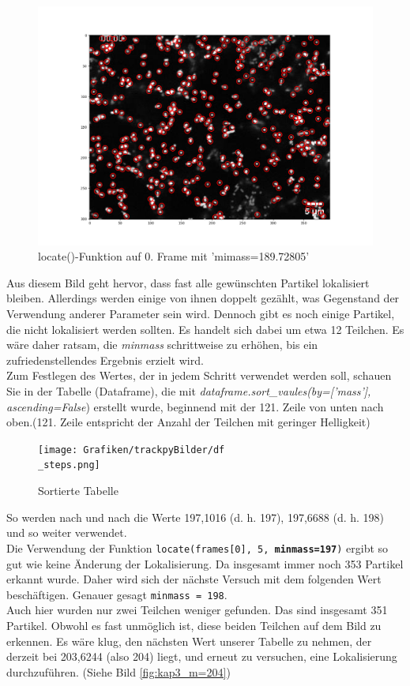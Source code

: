 \begin{enumerate}
\begin{figure}[H]
    \centering
    \includegraphics[scale=0.35]{Grafiken/trackpyBilder/locate_with_minmass_01.png}
    \caption{locate()-Funktion auf 0. Frame mit 'mimass=189.72805'}
    \label{fig:kap3_m=189}
\end{figure}

Aus diesem Bild geht hervor, dass fast alle gewünschten Partikel lokalisiert bleiben. Allerdings werden einige von ihnen doppelt gezählt, was Gegenstand der Verwendung anderer Parameter sein wird. Dennoch gibt es noch einige Partikel, die nicht lokalisiert werden sollten. Es handelt sich dabei um etwa 12 Teilchen. Es wäre daher ratsam, die \textit{minmass} schrittweise zu erhöhen, bis ein zufriedenstellendes Ergebnis erzielt wird.\\
Zum Festlegen des Wertes, der in jedem Schritt verwendet werden soll, schauen Sie in der Tabelle (Dataframe), die mit \textit{dataframe.sort\_vaules(by=['mass'], ascending=False}) erstellt wurde, beginnend mit der 121. Zeile von unten nach oben.(121. Zeile entspricht der Anzahl der Teilchen mit geringer Helligkeit)

\begin{figure}[H]
    \centering
    \texttt{[image: Grafiken/trackpyBilder/df\\\_steps.png]}
    \caption{Sortierte Tabelle}
    \label{fig:kap3_sortDataframes}
\end{figure}

So werden nach und nach die Werte 197,1016 (d. h. 197), 197,6688 (d. h. 198) und so weiter verwendet.\\
Die Verwendung der Funktion \texttt{locate(frames[0], 5, \textbf{minmass=197})} ergibt so gut wie keine Änderung der Lokalisierung. Da insgesamt immer noch 353 Partikel  erkannt wurde. Daher wird sich der nächste Versuch mit dem folgenden Wert beschäftigen. Genauer gesagt \texttt{minmass = 198}. \\
Auch hier wurden nur zwei Teilchen weniger gefunden. Das sind insgesamt 351 Partikel. Obwohl es fast unmöglich ist, diese beiden Teilchen auf dem Bild zu erkennen. 
Es wäre klug, den nächsten Wert unserer Tabelle zu nehmen, der derzeit bei 203,6244 (also 204) liegt, und erneut zu versuchen, eine Lokalisierung durchzuführen. (Siehe Bild \ref{fig:kap3_m=204})


\end{enumerate}
